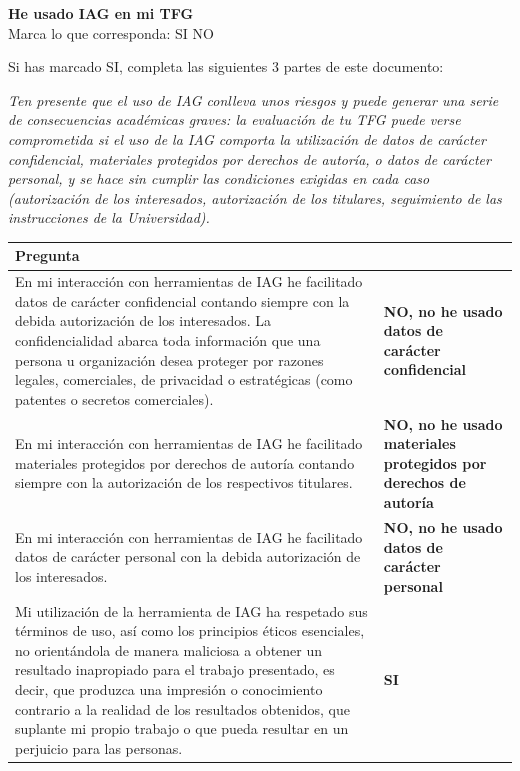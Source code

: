 \documentclass[12pt]{report} %
\begin{document}
\noindent\textbf{He usado IAG en mi TFG} \\
Marca lo que corresponda:  SI \quad \fbox{\phantom{X}} NO

\vspace{0.8em}
\noindent Si has marcado SI, completa las siguientes 3 partes de este documento:

\vspace{0.8em}
\noindent\textit{Ten presente que el uso de IAG conlleva unos riesgos y puede generar una serie de consecuencias académicas graves: la evaluación de tu TFG puede verse comprometida si el uso de la IAG comporta la utilización de datos de carácter confidencial, materiales protegidos por derechos de autoría, o datos de carácter personal, y se hace sin cumplir las condiciones exigidas en cada caso (autorización de los interesados, autorización de los titulares, seguimiento de las instrucciones de la Universidad).}

\vspace{1em}

\begin{table}[htbp]
\centering
\small
\begin{tabular}{|p{9.2cm}|p{5.8cm}|}
\hline
\textbf{Pregunta} & \\ \hline
En mi interacción con herramientas de IAG he facilitado datos de carácter confidencial contando siempre con la debida autorización de los interesados. La confidencialidad abarca toda información que una persona u organización desea proteger por razones legales, comerciales, de privacidad o estratégicas (como patentes o secretos comerciales). & \textbf{NO, no he usado datos de carácter confidencial} \\ \hline
En mi interacción con herramientas de IAG he facilitado materiales protegidos por derechos de autoría contando siempre con la autorización de los respectivos titulares. & \textbf{NO, no he usado materiales protegidos por derechos de autoría} \\ \hline
En mi interacción con herramientas de IAG he facilitado datos de carácter personal con la debida autorización de los interesados. & \textbf{NO, no he usado datos de carácter personal} \\ \hline
Mi utilización de la herramienta de IAG ha respetado sus términos de uso, así como los principios éticos esenciales, no orientándola de manera maliciosa a obtener un resultado inapropiado para el trabajo presentado, es decir, que produzca una impresión o conocimiento contrario a la realidad de los resultados obtenidos, que suplante mi propio trabajo o que pueda resultar en un perjuicio para las personas. & \textbf{SI} \\ \hline
\end{tabular}
\end{table}
\end{document}
